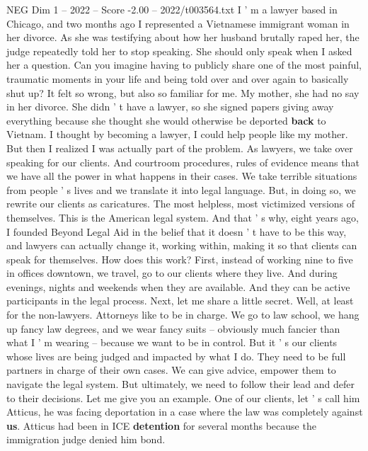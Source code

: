 \begin{textsample}{NEG Dim 1 – 2022 – Score -2.00 – 2022/t003564.txt}  \label{ex:f1_neg_010}
I ' m a lawyer based in Chicago, and two months ago I represented a Vietnamese immigrant woman in her divorce.
As she was testifying about how her husband brutally raped her, the judge repeatedly told her to stop speaking.
She should only speak when I asked her a question.
Can you imagine having to publicly share one of the most painful, traumatic moments in your life and being told over and over again to basically shut up?
It felt so wrong, but also so familiar for me.
My mother, she had no say in her divorce.
She didn ' t have a lawyer, so she signed papers giving away everything because she thought she would otherwise be deported \textbf{back} to Vietnam.
I thought by becoming a lawyer, I could help people like my mother.
But then I realized I was actually part of the problem.
As lawyers, we take over speaking for our clients.
And courtroom procedures, rules of evidence means that we have all the power in what happens in their cases.
We take terrible situations from people ' s lives and we translate it into legal language.
But, in doing so, we rewrite our clients as caricatures.
The most helpless, most victimized versions of themselves.
This is the American legal system.
And that ' s why, eight years ago, I founded Beyond Legal Aid in the belief that it doesn ' t have to be this way, and lawyers can actually change it, working within, making it so that clients can speak for themselves.
How does this work?
First, instead of working nine to five in offices downtown, we travel, go to our clients where they live.
And during evenings, nights and weekends when they are available.
And they can be active participants in the legal process.
Next, let me share a little secret.
Well, at least for the non-lawyers.
Attorneys like to be in charge.
We go to law school, we hang up fancy law degrees, and we wear fancy suits -- obviously much fancier than what I ' m wearing -- because we want to be in control.
But it ' s our clients whose lives are being judged and impacted by what I do.
They need to be full partners in charge of their own cases.
We can give advice, empower them to navigate the legal system.
But ultimately, we need to follow their lead and defer to their decisions.
Let me give you an example.
One of our clients, let ' s call him Atticus, he was facing deportation in a case where the law was completely against \textbf{us}.
Atticus had been in ICE \textbf{detention} for several months because the immigration judge denied him bond.

\end{textsample}
